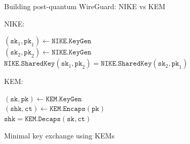 \begin{frame}{Building post-quantum WireGuard: NIKE vs KEM}


  NIKE:

$(\texttt{sk}_1, \texttt{pk}_1) \leftarrow \texttt{NIKE.KeyGen}$ \\
$(\texttt{sk}_2, \texttt{pk}_2) \leftarrow \texttt{NIKE.KeyGen}$ \\
$\texttt{NIKE.SharedKey}(\texttt{sk}_1, \texttt{pk}_2) = \texttt{NIKE.SharedKey}(\texttt{sk}_2, \texttt{pk}_1)$

  KEM:

$(\texttt{sk}, \texttt{pk}) \leftarrow \texttt{KEM.KeyGen}$ \\
$(\texttt{shk}, \texttt{ct}) \leftarrow \texttt{KEM.Encaps}(\texttt{pk})$ \\
$\texttt{shk} = \texttt{KEM.Decaps}(\texttt{sk}, \texttt{ct})$

\end{frame}

\begin{frame}{Minimal key exchange using KEMs}
\end{frame}

